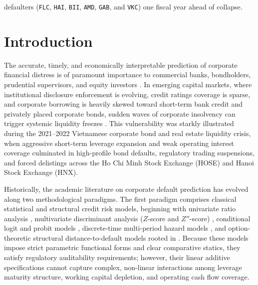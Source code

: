 \documentclass[pdflatex,sn-mathphys-num,twocolumn]{sn-jnl}
\theoremstyle{thmstyleone}
\theoremstyle{thmstyletwo}
\theoremstyle{thmstylethree}
\begin{document}
{defaulters (\texttt{FLC}, \texttt{HAI}, \texttt{BII}, \texttt{AMD}, \texttt{GAB}, and \texttt{VKC}) one fiscal year ahead of collapse.
}



\maketitle


\section{Introduction}
\label{sec:intro}

The accurate, timely, and economically interpretable prediction of corporate financial distress is of paramount importance to commercial banks, bondholders, prudential supervisors, and equity investors \citep{beaver1966financial,altman1968financial,campbell2008search}. In emerging capital markets, where institutional disclosure enforcement is evolving, credit ratings coverage is sparse, and corporate borrowing is heavily skewed toward short-term bank credit and privately placed corporate bonds, sudden waves of corporate insolvency can trigger systemic liquidity freezes \citep{altman1995emerging,pham2018financial,tran2023examining}. This vulnerability was starkly illustrated during the 2021--2022 Vietnamese corporate bond and real estate liquidity crisis, when aggressive short-term leverage expansion and weak operating interest coverage culminated in high-profile bond defaults, regulatory trading suspensions, and forced delistings across the Ho Chi Minh Stock Exchange (HOSE) and Hanoi Stock Exchange (HNX).

Historically, the academic literature on corporate default prediction has evolved along two methodological paradigms. The first paradigm comprises classical statistical and structural credit risk models, beginning with univariate ratio analysis \citep{beaver1966financial}, multivariate discriminant analysis ($Z$-score and $Z''$-score) \citep{altman1968financial,altman1995emerging,altman2017financial}, conditional logit and probit models \citep{ohlson1980financial,zmijewski1984methodological}, discrete-time multi-period hazard models \citep{shumway2001forecasting,chava2004bankruptcy,campbell2008search,bauer2014are}, and option-theoretic structural distance-to-default models rooted in \citet{merton1974pricing} \citep{hillegeist2004assessing,duffie2007multi,bharath2008forecasting}. Because these models impose strict parametric functional forms and clear comparative statics, they satisfy regulatory auditability requirements; however, their linear additive specifications cannot capture complex, non-linear interactions among leverage maturity structure, working capital depletion, and operating cash flow coverage.
\end{document}
